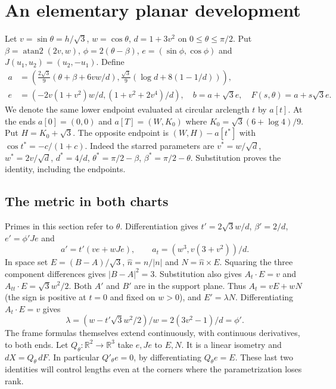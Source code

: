 \documentclass[10pt,letterpaper]{article}
\newcommand{\R}{\mathbb R}\newcommand{\norm}[1]{\left\lVert#1\right\rVert}
\newcommand{\chapterpage}{\clearpage}
\begin{document}
\section{An elementary planar development}\label{sec:dev}
Let $v=\sin\theta=h/\sqrt3$, $w=\cos\theta$, $d=1+3v^2$ on $0\le\theta\le\pi/2$. Put $\beta=\operatorname{atan2}(2v,w)$, $\phi=2(\theta-\beta)$, $e=(\sin\phi,\cos\phi)$ and $J(u_1,u_2)=(u_2,-u_1)$. Define
\begin{align*}
 a&=\left(\tfrac{2\sqrt3}{9}(\theta+\beta+6vw/d),
             \tfrac{\sqrt3}{9}(\log d+8(1-1/d))\right),\\
 e&=\left(-2v(1+v^2)w/d,(1+v^2+2v^4)/d\right),\quad
 b=a+\sqrt3 e,\quad F(s,\theta)=a+s\sqrt3 e .
\end{align*}
We denote the same lower endpoint evaluated at circular arclength $t$ by $a[t]$. At the ends $a[0]=(0,0)$ and $a[T]=(W,K_0)$ where
$K_0=\sqrt3(6+\log4)/9$. Put $H=K_0+\sqrt3$.
The opposite endpoint is $(W,H)-a[t^*]$ with $\cos t^*=-c/(1+c)$.
Indeed the starred parameters are $v^*=w/\sqrt d$, $w^*=2v/\sqrt d$, $d^*=4/d$, $\theta^*=\pi/2-\beta$, $\beta^*=\pi/2-\theta$. Substitution proves the identity, including the endpoints.

\chapterpage\subsection*{The metric in both charts}
Primes in this section refer to $\theta$. Differentiation gives
$t'=2\sqrt3 w/d$, $\beta'=2/d$, $e'=\phi' Je$ and
\[
  a'=t'(ve+wJe),\qquad a_t=(w^3, v(3+v^2))/d .
\]
In space set $E=(B-A)/\sqrt3$, $\widehat n=n/|n|$ and $N=\widehat n\times E$.
Squaring the three component differences gives $|B-A|^2=3$. Substitution also gives
$A_t\cdot E=v$ and $A_{tt}\cdot E=\sqrt3 w^2/2$.
Both $A'$ and $B'$ are in the support plane. Thus $A_t=vE+wN$ (the sign is positive at $t=0$ and fixed on $w>0$), and $E'=\lambda N$. Differentiating $A_t\cdot E=v$ gives
\[
   \lambda=(w-t'\sqrt3 w^2/2)/w=2(3v^2-1)/d=\phi'.
\]
The frame formulas themselves extend continuously, with continuous derivatives, to both ends. Let $Q_\theta\colon\R^2\to\R^3$ take $e,Je$ to $E,N$. It is a linear isometry and $dX=Q_\theta\,dF$. In particular $Q'_\theta e=0$, by differentiating $Q_\theta e=E$. These last two identities will control lengths even at the corners where the parametrization loses rank.
\end{document}

